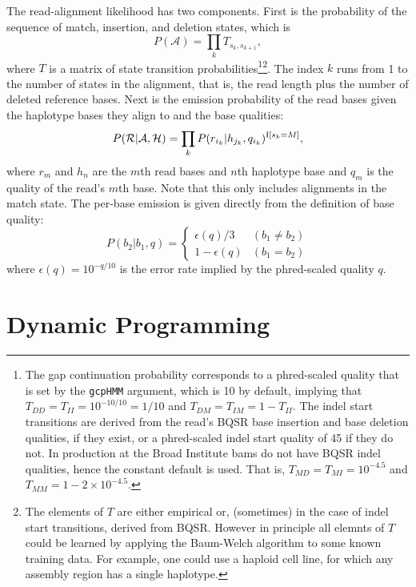 \documentclass[nofootinbib,amssymb,amsmath]{revtex4}
\newcommand{\code}[1]{\texttt{#1}}
\newcommand{\mc}[1]{\mathcal{#1}}
\begin{document}
The read-alignment likelihood has two components.  First is the probability of the sequence of match, insertion, and deletion states, which is
\begin{equation}
P(\mc{A}) = \prod_k T_{s_k, s_{k+1}},
\end{equation}
where $T$ is a matrix of state transition probabilities\footnote{The gap continuation probability corresponds to a phred-scaled quality that is set by the \code{gcpHMM} argument, which is 10 by default, implying that $T_{DD} = T_{II} = 10^{-10/10} = 1/10$ and $T_{DM} = T_{IM} = 1 - T_{II}$.  The indel start transitions are derived from the read's BQSR base insertion and base deletion qualities, if they exist, or a phred-scaled indel start quality of 45 if they do not.  In production at the Broad Institute bams do not have BQSR indel qualities, hence the constant default is used.  That is, $T_{MD} = T_{MI} = 10^{-4.5}$ and $T_{MM} = 1 - 2 \times 10^{-4.5}$.}\footnote{The elements of $T$ are either empirical or, (sometimes) in the case of indel start transitions, derived from BQSR.  However in principle all elemnts of $T$ could be learned by applying the Baum-Welch algorithm to some known training data.  For example, one could use a haploid cell line, for which any assembly region has a single haplotype.}.  The index $k$ runs from 1 to the number of states in the alignment, that is, the read length plus the number of deleted reference bases.  Next is the emission probability of the read bases given the haplotype bases they align to and the base qualities:
\begin{equation}
P(\mc{R} | \mc{A}, \mc{H}) = \prod_k P(r_{i_k} | h_{j_k}, q_{i_k})^{{\rm I}[s_k = M]},
\end{equation}
where $r_m$ and $h_n$ are the $m$th read bases and $n$th haplotype base and $q_m$ is the quality of the read's $m$th base.  Note that this only includes alignments in the match state.  The per-base emission is given directly from the definition of base quality:
\begin{equation}
P(b_2 | b_1, q) = \left\{ \begin{array}{cc} \epsilon(q)/3 & (b_1 \ne b_2) \\ 1 - \epsilon(q) & (b_1 = b_2)  \end{array} \right.
\end{equation}
where $\epsilon(q) = 10^{-q/10}$ is the error rate implied by the phred-scaled quality $q$.

\section{Dynamic Programming}
\end{document}
